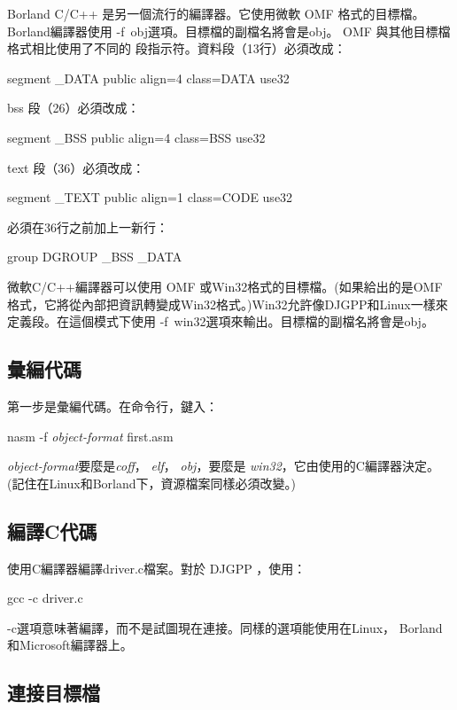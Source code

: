 Borland C/C++ 是另一個流行的編譯器。它使用微軟
OMF 格式的目標檔。Borland編譯器使用{\code
-f~obj}選項。目標檔的副檔名將會是{\code obj}。 OMF
與其他目標檔格式相比使用了不同的{\code
段}指示符。資料段（13行）必須改成：
\begin{CodeQuote}
segment \_DATA public align=4 class=DATA use32
\end{CodeQuote}
 bss 段（26）必須改成：
\begin{CodeQuote}
segment \_BSS public align=4 class=BSS use32
\end{CodeQuote}
text 段（36）必須改成：
\begin{CodeQuote}
segment \_TEXT public align=1 class=CODE use32
\end{CodeQuote}
必須在36行之前加上一新行：
\begin{CodeQuote}
group DGROUP \_BSS \_DATA
\end{CodeQuote}

微軟C/C++編譯器可以使用 OMF
或Win32格式的目標檔。(如果給出的是OMF格式，它將從內部把資訊轉變成Win32格式。)Win32允許像DJGPP和Linux一樣來定義段。在這個模式下使用{\code
-f~win32}選項來輸出。目標檔的副檔名將會是{\code obj}。

\subsection{彙編代碼}

第一步是彙編代碼。在命令行，鍵入：
\begin{CodeQuote}
nasm -f {\em object-format} first.asm
\end{CodeQuote}
{\em object-format}要麼是{\em coff\/}， {\em elf\/}， {\em
obj}，要麼是{\em
win32}，它由使用的C編譯器決定。(記住在Linux和Borland下，資源檔案同樣必須改變。)

\subsection{編譯C代碼}

使用C編譯器編譯{\code driver.c}檔案。對於 DJGPP ，使用：
\begin{CodeQuote}
gcc -c driver.c
\end{CodeQuote}
{\code
-c}選項意味著編譯，而不是試圖現在連接。同樣的選項能使用在Linux，
Borland和Microsoft編譯器上。

\subsection{連接目標檔 \label{seq:linking} }

